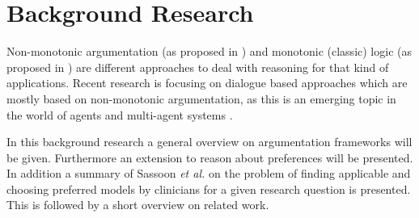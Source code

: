 \section{Background Research}




Non-monotonic argumentation (as proposed in \cite{liao,dung1995}) and monotonic (classic) logic (as proposed in \cite{Reiter1980}) are different approaches to deal with reasoning for that kind of applications. Recent research is focusing on dialogue based approaches which are mostly based on non-monotonic argumentation, as this is an emerging topic in the world of agents and multi-agent systems \cite{parsons2000,Walton1995}.

In this background research a general overview on argumentation frameworks will be given. Furthermore an extension to reason about preferences will be presented. In addition a summary of Sassoon \textit{et al.} \cite{sassoon2014} on the problem of finding applicable and choosing preferred models by clinicians for a given research question is presented. This is followed by a short overview on related work.







 
